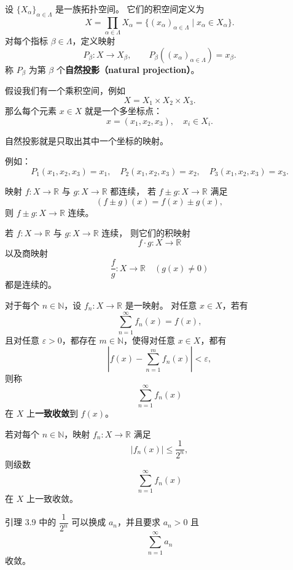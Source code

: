 \begin{definition}[自然投影]
设 $\{X_\alpha\}_{\alpha\in\Lambda}$ 是一族拓扑空间。  
它们的积空间定义为
\[
X=\prod_{\alpha\in\Lambda}X_\alpha
=\{(x_\alpha)_{\alpha\in\Lambda}\mid x_\alpha\in X_\alpha\}.
\]
对每个指标 $\beta\in\Lambda$，定义映射
\[
P_\beta:X\to X_\beta,\qquad
P_\beta((x_\alpha)_{\alpha\in\Lambda})=x_\beta.
\]
称 $P_\beta$ 为第 $\beta$ 个\textbf{自然投影（natural projection）}。
\end{definition}
\begin{note}
    假设我们有一个乘积空间，例如
\[
X = X_1 \times X_2 \times X_3.
\]
那么每个元素 $x\in X$ 就是一个多坐标点：
\[
x = (x_1, x_2, x_3), \quad x_i \in X_i.
\]

自然投影就是只取出其中一个坐标的映射。

例如：
\[
P_1(x_1, x_2, x_3) = x_1, \quad
P_2(x_1, x_2, x_3) = x_2, \quad
P_3(x_1, x_2, x_3) = x_3.
\]
\end{note}
\begin{theorem}[连续映射的加减还是连续映射得满足可以拆括号]
映射 $f:X\to\mathbb{R}$ 与 $g:X\to\mathbb{R}$ 都连续，  
若 $f\pm g:X\to\mathbb{R}$ 满足
\[
(f\pm g)(x)=f(x)\pm g(x),
\]
则 $f\pm g:X\to\mathbb{R}$ 连续。
\end{theorem}
\begin{theorem}
若 $f:X\to\mathbb{R}$ 与 $g:X\to\mathbb{R}$ 连续，
则它们的积映射
\[
f\cdot g:X\to\mathbb{R}
\]
以及商映射
\[
\frac{f}{g}:X\to\mathbb{R}\quad (g(x)\ne 0)
\]
都是连续的。
\end{theorem}
对于每个 $n\in\mathbb{N}$，设 $f_n:X\to\mathbb{R}$ 是一映射。  
对任意 $x\in X$，若有
\[
\sum_{n=1}^{\infty} f_n(x) = f(x),
\]
且对任意 $\varepsilon>0$，都存在 $m\in\mathbb{N}$，使得对任意 $x\in X$，都有
\[
\left| f(x) - \sum_{n=1}^{m} f_n(x) \right| < \varepsilon,
\]
则称
\[
\sum_{n=1}^{\infty} f_n(x)
\]
在 $X$ 上\textbf{一致收敛}到 $f(x)$。
\begin{lemma}[比较收敛]
若对每个 $n\in\mathbb{N}$，映射 $f_n:X\to\mathbb{R}$ 满足
\[
|f_n(x)|\le \frac{1}{2^n},
\]
则级数
\[
\sum_{n=1}^{\infty} f_n(x)
\]
在 $X$ 上一致收敛。
\end{lemma}
\begin{note}
引理 3.9 中的 $\dfrac{1}{2^n}$ 可以换成 $a_n$，并且要求 $a_n>0$ 且
\[
\sum_{n=1}^{\infty} a_n
\]
收敛。
\end{note}

